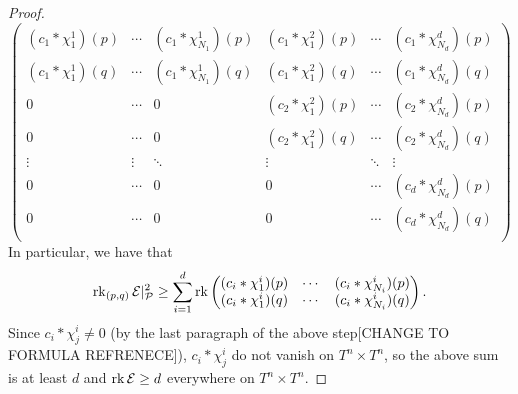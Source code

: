 \begin{proof}
    \[
    \begin{pmatrix}
        (c_1 * \chi^1_1) (p) & \cdots & (c_1 * \chi^1_{N_1}) (p) & (c_1 * \chi^2_1) (p) & \cdots &  (c_1 * \chi^d_{N_d}) (p) \\
        (c_1 * \chi^1_1) (q) & \cdots & (c_1 * \chi^1_{N_1}) (q) & (c_1 * \chi^2_1) (q) & \cdots &  (c_1 * \chi^d_{N_d}) (q) \\
        0 & \cdots & 0 & (c_2 * \chi^2_1) (p) & \cdots &  (c_2 * \chi^d_{N_d}) (p) \\
        0 & \cdots & 0 & (c_2 * \chi^2_1) (q) & \cdots &  (c_2 * \chi^d_{N_d}) (q) \\
        \vdots & \vdots & \ddots & \vdots & \ddots & \vdots \\
        0 & \cdots & 0 & 0 & \cdots &  (c_d * \chi^d_{N_d}) (p) \\
        0 & \cdots & 0 & 0 & \cdots &  (c_d * \chi^d_{N_d}) (q) \\
    \end{pmatrix}
    \]
    In particular, we have that
    \[
    \operatorname{rk}_{(p, q)} \mathcal E|^2_{\mathcal P} \ge \sum_{i = 1}^d \operatorname{rk}
    \begin{pmatrix}
        (c_i * \chi^i_1) (p) & \cdots & (c_i * \chi^i_{N_i}) (p) \\
        (c_i * \chi^i_1) (q) & \cdots & (c_i * \chi^i_{N_i}) (q)
    \end{pmatrix}.
    \]
    Since $c_i * \chi^i_j \ne 0$ (by the last paragraph of the above step[CHANGE TO FORMULA REFRENECE]), $c_i * \chi^i_j$ do not vanish on $T^n \times T^n$, so the above sum is at least $d$ and $\operatorname{rk} \mathcal E \ge d$ everywhere on $T^n \times T^n$.



\end{proof}
